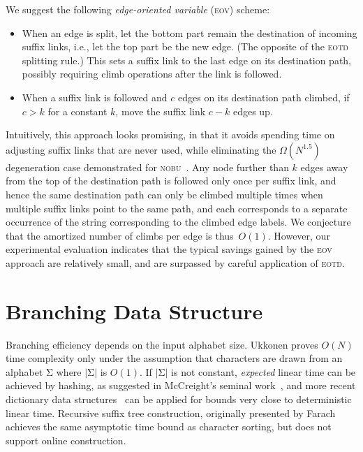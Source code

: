 \documentclass{llncs}
\newcommand\alphabet{{\mathrm{\Sigma}}}
\newcommand\nobu{\textsc{nobu}\xspace}
\newcommand\eotd{\textsc{eotd}\xspace}
\newcommand\eov{\textsc{eov}\xspace}
\begin{document}
We suggest the following \emph{edge-oriented
  variable} (\eov) scheme:
\begin{itemize}
\item When an edge is split, let the bottom part remain the destination of
  incoming suffix links, i.e., let the top part be the new edge. (The
  opposite of the \eotd splitting rule.) This sets a suffix link to the last
  edge on its destination path, possibly requiring
  climb operations after the link is followed.
\item When a suffix link is followed and $c$ edges on its destination path
  climbed, if $c>k$ for a constant $k$, move the suffix link $c-k$ edges up.
\end{itemize}


Intuitively, this approach looks promising, in that it avoids spending time on
adjusting suffix links that are never used, while eliminating the
$\Omega(N^{1.5})$ degeneration case demonstrated for
\nobu~\cite{SenftBranching}. Any node further than $k$ edges away from the top
of the destination path is followed only once per suffix link, and hence the
same destination path can only be climbed multiple times when multiple suffix
links point to the same path, and each corresponds to a separate occurrence of
the string corresponding to the climbed edge labels. We conjecture that the
amortized number of climbs per edge is thus~$O(1)$. However, our experimental
evaluation indicates that the typical savings gained by the \eov approach are
relatively small, and are surpassed by careful application of \eotd.

\section{Branching Data Structure}\label{sec-hashvsll}

Branching efficiency depends on the input alphabet size.  Ukkonen proves $O(N)$ time complexity only under the
assumption that characters are drawn from an alphabet $\alphabet$ where
$|\alphabet|$ is $O(1)$. If $|\alphabet|$ is not constant, \emph{expected} linear
time can be achieved by hashing, as suggested in McCreight's seminal
work~\cite{McR}, and more recent dictionary data
structures~\cite{arbitman2010backyard,hagerup2001deterministic} can be applied
for bounds very close to deterministic linear time. Recursive suffix tree
construction, originally presented by Farach~\cite{FarFOCS} achieves the
same asymptotic time bound as character sorting, but does not support online
construction.
\end{document}
